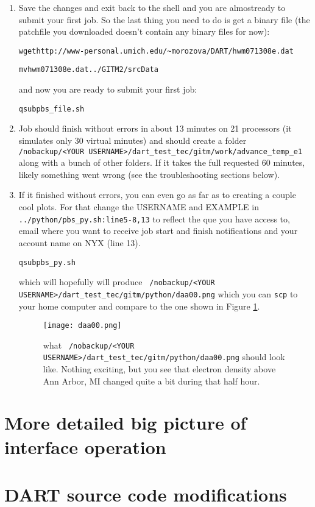 \documentclass[letterpaper, 11 pt]{article}
\newcommand{\file}[1]{ {\tt \color{red} #1} }
\newcommand{\cmd}[1]{\begin{alltt}\colorbox{p_gr}{#1}\end{alltt} }
\begin{document}
\begin{enumerate}
\item Save the changes and exit back to the shell and you are almostready to submit your first job. So the last thing you need to do is get a binary file (the patchfile you downloaded doesn't contain any binary files for now):
\cmd{wget http://www-personal.umich.edu/{\textasciitilde}morozova/DART/hwm071308e.dat}
\cmd{mv hwm071308e.dat ../GITM2/srcData}
and now you are ready to submit your first job:
\cmd{qsub pbs\_file.sh}

\item Job should finish without errors in about 13 minutes on 21 processors (it simulates only 30 virtual minutes) and should create a folder \file{/nobackup/<YOUR USERNAME>/dart\_test\_tec/gitm/work/advance\_temp\_e1} along with a bunch of other folders. If it takes the full requested 60 minutes, likely something went wrong (see the troubleshooting sections below).

\item If it finished without errors, you can even go as far as to creating a couple cool plots. For that change the USERNAME and EXAMPLE in \file{../python/pbs\_py.sh:line5-8,13} to reflect the que you have access to, email where you want to receive job start and finish notifications and your account name on NYX (line 13).
\cmd{qsub pbs\_py.sh}
which will hopefully will produce \file{/nobackup/<YOUR USERNAME>/dart\_test\_tec/gitm/python/daa00.png} which you can \verb|scp| to your home computer and compare to the one shown in Figure \ref{tec_daa}.

\begin{figure}
  \texttt{[image: daa00.png]}
\caption{what \file{/nobackup/<YOUR USERNAME>/dart\_test\_tec/gitm/python/daa00.png} should look like. Nothing exciting, but you see that electron density above Ann Arbor, MI changed quite a bit during that half hour.} \label{tec_daa}
\end{figure}



\end{enumerate}



\section{More detailed big picture of interface operation}

\section{DART source code modifications}\label{s:dart}
\end{document}
